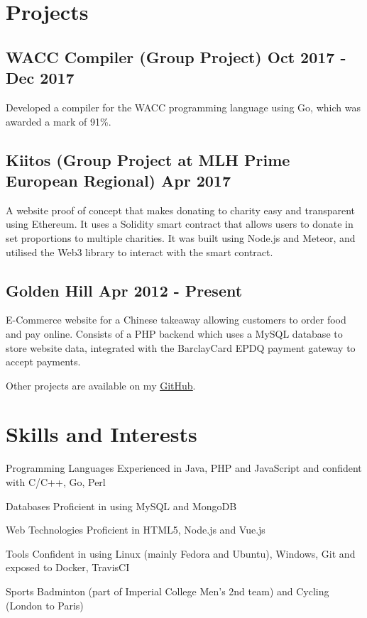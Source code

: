 \documentclass[a4paper]{article}
\begin{document}
\section*{Projects}

\subsection*{WACC Compiler \textnormal{(Group Project)} \hfill Oct 2017 - Dec 2017}

Developed a compiler for the WACC programming language using Go, which was awarded a mark of 91\%.

\subsection*{Kiitos \textnormal{(Group Project at MLH Prime European Regional)} \hfill Apr 2017}

A website proof of concept that makes donating to charity easy and transparent using Ethereum. It uses a Solidity smart contract that allows users to donate in set proportions to multiple charities. It was built using Node.js and Meteor, and utilised the Web3 library to interact with the smart contract.

\subsection*{Golden Hill \hfill Apr 2012 - Present}

E-Commerce website for a Chinese takeaway allowing customers to order food and pay online. Consists of a PHP backend which uses a MySQL database to store website data, integrated with the BarclayCard EPDQ payment gateway to accept payments.

\vspace{6pt}

Other projects are available on my \href{https://github.com/Qiang-Feng}{\underline{GitHub}}.

\section*{Skills and Interests}

\vspace{6pt}

\begin{eqlist}
    \item[Programming Languages] Experienced in Java, PHP and JavaScript and confident with C/C++, Go, Perl
    \item[Databases] Proficient in using MySQL and MongoDB
    \item[Web Technologies] Proficient in HTML5, Node.js and Vue.js
    \item[Tools] Confident in using Linux (mainly Fedora and Ubuntu), Windows, Git and exposed to Docker, TravisCI
    \item[Sports] Badminton (part of Imperial College Men's 2nd team) and Cycling (London to Paris)
\end{eqlist}
\end{document}
